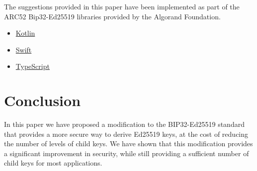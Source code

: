 \documentclass[12pt, a4paper, twocolumn]{article}
\begin{document}
The suggestions provided in this paper have been implemented as part of the ARC52 Bip32-Ed25519 libraries provided by the Algorand Foundation.

\begin{itemize}
  \item \href{https://github.com/algorandfoundation/bip32-ed25519-kotlin}{Kotlin}
  \item \href{https://github.com/algorandfoundation/bip32-ed25519-swift}{Swift}
  \item \href{https://github.com/algorandfoundation/bip32-ed25519-ts}{TypeScript}
\end{itemize}


\section{Conclusion}

In this paper we have proposed a modification to the BIP32-Ed25519 standard that provides a more secure way to derive Ed25519 keys, at the cost of reducing the number of levels of child keys. We have shown that this modification provides a significant improvement in security, while still providing a sufficient number of child keys for most applications.


\nocite{*}


\end{document}
